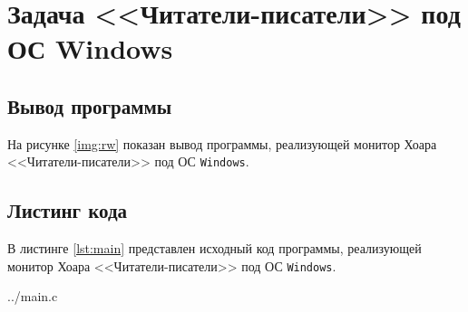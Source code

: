 \chapter{Задача <<Читатели-писатели>> под ОС Windows}

\section{Вывод программы}

На рисунке \ref{img:rw} показан вывод программы, реализующей монитор Хоара <<Читатели-писатели>> под ОС \texttt{Windows}.

\clearpage

\section{Листинг кода}

В листинге \ref{lst:main} представлен исходный код программы, реализующей монитор Хоара <<Читатели-писатели>> под ОС \texttt{Windows}.

\begin{lstinputlisting}[
        caption={монитор Хоара <<Читатели-писатели>> под ОС Windows},
        label={lst:main},
        linerange={1},
        style={cstyle}
    ]{../main.c}
\end{lstinputlisting}
